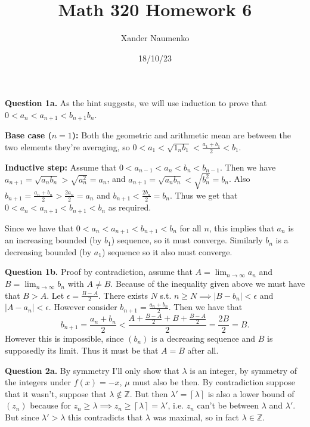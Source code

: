 \documentclass[letterpaper, reqno,11pt]{article}
\begin{document}
\title{Math 320 Homework 6}
\date{18/10/23}
\author{Xander Naumenko}
\maketitle

{\medskip\noindent\bf Question 1a.} As the hint suggests, we will use induction to prove that $0<a_n<a_{n+1}<b_{n+1}b_n$.

{\noindent\bf Base case ($n=1$):} Both the geometric and arithmetic mean are between the two elements they're averaging, so $0<a_1< \sqrt{1_nb_1}<\frac{a_1+b_1}{2}<b_1$.

{\noindent\bf Inductive step:} Assume that $0<a_{n-1}<a_n<b_n<b_{n-1}$. Then we have $a_{n+1}=\sqrt{a_nb_n}>\sqrt{a_n^2}=a_n$, and $a_{n+1}=\sqrt{a_nb_n}<\sqrt{b_n^2}=b_n$. Also $b_{n+1}=\frac{a_{n}+b_n}{2}>\frac{2a_n}{2}=a_n$ and $b_{n+1}< \frac{2b_n}{2}=b_n$. Thus we get that $0<a_n<a_{n+1}<b_{n+1}<b_n$ as required.

Since we have that $0<a_{n}<a_{n+1}<b_{n+1}<b_n$ for all $n$, this implies that $a_n$ is an increasing bounded (by $b_1$) sequence, so it must converge. Similarly $b_n$ is a decreasing bounded (by $a_1$) sequence so it also must converge.

{\medskip\noindent\bf Question 1b.} Proof by contradiction, assume that $A=\lim_{n\to\infty}a_n$ and $B=\lim_{n\to\infty}b_n$ with $A\neq B$. Because of the inequality given above we must have that $B>A$. Let $\epsilon=\frac{B-A}{2}$. There exists $N$ s.t. $n\geq N\implies |B-b_n|<\epsilon$ and $|A-a_n|<\epsilon$. However consider $b_{n+1}=\frac{a_n+b_n}{2}$. Then we have that
\[
b_{n+1}=\frac{a_n+b_n}{2} < \frac{A+\frac{B-A}{2}+B+\frac{B-A}{2}}{2}=\frac{2B}{2}=B
.\]
However this is impossible, since $(b_n)$ is a decreasing sequence and $B$ is supposedly its limit. Thus it must be that $A=B$ after all.

\newpage\phantom{blabla}
\newpage


{\medskip\noindent\bf Question 2a.} By symmetry I'll only show that $\lambda$ is an integer, by symmetry of the integers under $f(x)=-x$, $\mu$ must also be then. By contradiction suppose that it wasn't, suppose that $\lambda\notin \mathbb{Z}$. But then $\lambda'=\left\lceil \lambda \right\rceil$ is also a lower bound of $(z_n)$ because for $z_n\geq \lambda\implies z_n\geq \left\lceil \lambda \right\rceil=\lambda'$, i.e. $z_n$ can't be between $\lambda$ and $\lambda'$. But since $\lambda'>\lambda$ this contradicts that $\lambda$ was maximal, so in fact $\lambda\in \mathbb{Z}$.
\end{document}
